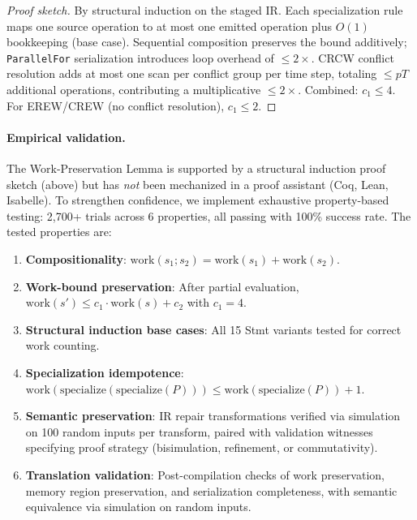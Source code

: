 \documentclass[11pt]{article}
\begin{document}
\begin{proof}[Proof sketch]
By structural induction on the staged IR\@.  Each specialization rule maps
one source operation to at most one emitted operation plus $O(1)$
bookkeeping (base case).  Sequential composition preserves the bound
additively; \texttt{ParallelFor} serialization introduces loop overhead
of $\le 2\times$.  CRCW conflict resolution adds at most one scan per
conflict group per time step, totaling $\le pT$ additional operations,
contributing a multiplicative $\le 2\times$.  Combined: $c_1 \le 4$.
For EREW/CREW (no conflict resolution), $c_1 \le 2$.
\end{proof}

\paragraph{Empirical validation.}
The Work-Preservation Lemma is supported by a structural induction proof
sketch (above) but has \emph{not} been mechanized in a proof assistant
(Coq, Lean, Isabelle).  To strengthen confidence, we implement exhaustive
property-based testing: 2,700+ trials across 6 properties, all passing
with 100\% success rate.  The tested properties are:

\begin{enumerate}
\item \textbf{Compositionality}: $\text{work}(s_1; s_2) = \text{work}(s_1) + \text{work}(s_2)$.
\item \textbf{Work-bound preservation}: After partial evaluation,
  $\text{work}(s') \le c_1 \cdot \text{work}(s) + c_2$ with $c_1 = 4$.
\item \textbf{Structural induction base cases}: All 15 Stmt variants
  tested for correct work counting.
\item \textbf{Specialization idempotence}:
  $\text{work}(\text{specialize}(\text{specialize}(P))) \le
  \text{work}(\text{specialize}(P)) + 1$.
\item \textbf{Semantic preservation}: IR repair transformations
  verified via simulation on 100 random inputs per transform, paired
  with validation witnesses specifying proof strategy (bisimulation,
  refinement, or commutativity).
\item \textbf{Translation validation}: Post-compilation checks of work
  preservation, memory region preservation, and serialization completeness,
  with semantic equivalence via simulation on random inputs.
\end{enumerate}
\end{document}
